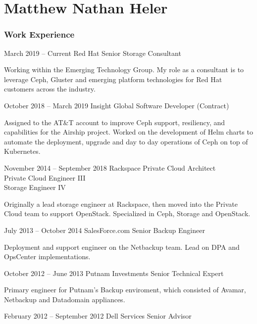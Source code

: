 \documentclass{tccv}
\begin{document}
\part{Matthew Nathan Heler}

\section{Work Experience}

\begin{eventlist}

\item{March 2019 -- Current}
	 {Red Hat}
	 {Senior Storage Consultant}
	 
Working within the Emerging Technology Group. My role as a consultant is to leverage Ceph, Gluster and emerging platform technologies for Red Hat customers across the industry.

\item{October 2018 -- March 2019}
	 {Insight Global}
	 {Software Developer (Contract)}
	 
Assigned to the AT\&T account to improve Ceph support, resiliency, and capabilities for the Airship project. Worked on the development of Helm charts to automate the deployment, upgrade and day to day operations of Ceph on top of Kubernetes.

\item{November 2014 -- September 2018}
	 {Rackspace}
	 {Private Cloud Architect \\ Private Cloud Engineer III \\ Storage Engineer IV}

Originally a lead storage engineer at Rackspace, then moved into the Private Cloud team to support OpenStack. Specialized in Ceph, Storage and OpenStack.

\item{July 2013 -- October 2014}
     {SalesForce.com}
     {Senior Backup Engineer}

Deployment and support engineer on the Netbackup team. Lead on DPA and OpsCenter implementations.

\item{October 2012 -- June 2013}
     {Putnam Investments}
     {Senior Technical Expert}

Primary engineer for Putnam's Backup enviroment, which consisted of Avamar, Netbackup and Datadomain appliances.

\item{February 2012 -- September 2012}
     {Dell Services}
     {Senior Advisor}


\end{eventlist}
\end{document}
